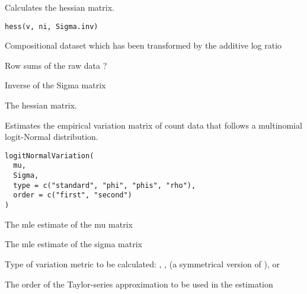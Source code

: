 \documentclass[a4paper]{book}
\begin{document}
%
\begin{Description}\relax
Calculates the hessian matrix.
\end{Description}
%
\begin{Usage}
\begin{verbatim}
hess(v, ni, Sigma.inv)
\end{verbatim}
\end{Usage}
%
\begin{Arguments}
\begin{ldescription}
\item[\code{v}] Compositional dataset which has been transformed by the additive log ratio

\item[\code{ni}] Row sums of the raw data ?

\item[\code{Sigma.inv}] Inverse of the Sigma matrix
\end{ldescription}
\end{Arguments}
%
\begin{Value}
The hessian matrix.
\end{Value}
%
\begin{Description}\relax
Estimates the empirical variation matrix of count data that follows a multinomial
logit-Normal distribution.
\end{Description}
%
\begin{Usage}
\begin{verbatim}
logitNormalVariation(
  mu,
  Sigma,
  type = c("standard", "phi", "phis", "rho"),
  order = c("first", "second")
)
\end{verbatim}
\end{Usage}
%
\begin{Arguments}
\begin{ldescription}
\item[\code{mu}] The mle estimate of the mu matrix

\item[\code{Sigma}] The mle estimate of the sigma matrix

\item[\code{type}] Type of variation metric to be calculated: , ,
 (a symmetrical version of ), or 

\item[\code{order}] The order of the Taylor-series approximation to be used in the 
estimation
\end{ldescription}
\end{Arguments}
\end{document}
